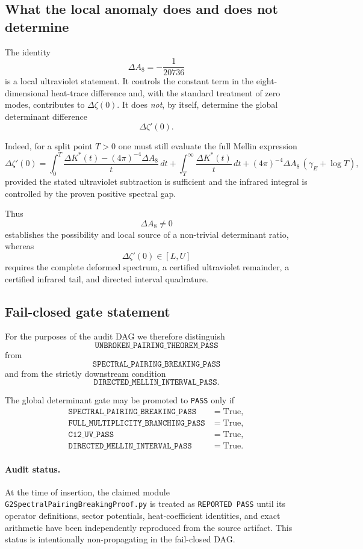 \subsection{What the local anomaly does and does not determine}

The identity
\[
\Delta A_8=-\frac{1}{20736}
\]
is a local ultraviolet statement.  It controls the constant term in the
eight-dimensional heat-trace difference and, with the standard treatment of
zero modes, contributes to $\Delta\zeta(0)$.  It does \emph{not}, by itself,
determine the global determinant difference
\[
\Delta\zeta'(0).
\]

Indeed, for a split point $T>0$ one must still evaluate the full Mellin
expression
\[
\Delta\zeta'(0)
=
\int_0^T
\frac{
\Delta K^\ast(t)-(4\pi)^{-4}\Delta A_8
}{t}\,dt
+
\int_T^\infty
\frac{\Delta K^\ast(t)}{t}\,dt
+
(4\pi)^{-4}\Delta A_8\,
(\gamma_E+\log T),
\]
provided the stated ultraviolet subtraction is sufficient and the infrared
integral is controlled by the proven positive spectral gap.

Thus
\[
\boxed{
\Delta A_8\neq0
}
\]
establishes the possibility and local source of a non-trivial determinant
ratio, whereas
\[
\boxed{
\Delta\zeta'(0)\in[L,U]
}
\]
requires the complete deformed spectrum, a certified ultraviolet remainder,
a certified infrared tail, and directed interval quadrature.

\subsection{Fail-closed gate statement}

For the purposes of the audit DAG we therefore distinguish
\[
\texttt{UNBROKEN\_PAIRING\_THEOREM\_PASS}
\]
from
\[
\texttt{SPECTRAL\_PAIRING\_BREAKING\_PASS}
\]
and from the strictly downstream condition
\[
\texttt{DIRECTED\_MELLIN\_INTERVAL\_PASS}.
\]

The global determinant gate may be promoted to \texttt{PASS} only if
\[
\begin{aligned}
\texttt{SPECTRAL\_PAIRING\_BREAKING\_PASS}
&=\mathrm{True},\\
\texttt{FULL\_MULTIPLICITY\_BRANCHING\_PASS}
&=\mathrm{True},\\
\texttt{C12\_UV\_PASS}
&=\mathrm{True},\\
\texttt{DIRECTED\_MELLIN\_INTERVAL\_PASS}
&=\mathrm{True}.
\end{aligned}
\]

\paragraph{Audit status.}
At the time of insertion, the claimed module
\texttt{G2SpectralPairingBreakingProof.py} is treated as
\texttt{REPORTED PASS} until its operator definitions, sector potentials,
heat-coefficient identities, and exact arithmetic have been independently
reproduced from the source artifact.  This status is intentionally
non-propagating in the fail-closed DAG.
